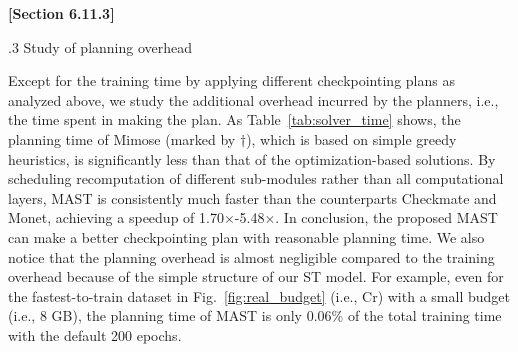 \begin{sloppypar}
\renewcommand{\thetable}{\ref{tab:solver_time}}
\begin{table}[t]
    \centering
    \caption{Planning time (in ms) averaged over budget.}
    \vspace{-1.5ex}
    \vspace{-4ex}
\end{table}

\begin{framed}
    \textbf{[Section 6.11.3]}

.3 Study of planning overhead

Except for the training time by applying different checkpointing plans as analyzed above, we study the additional overhead incurred by the planners, i.e., the time spent in making the plan. As Table~\ref{tab:solver_time} shows, the planning time of Mimose (marked by $\dag$), which is based on simple greedy heuristics, is significantly less than that of the optimization-based solutions. By scheduling recomputation of different sub-modules rather than all computational layers, MAST is consistently much faster than the counterparts Checkmate and Monet, achieving a speedup of 1.70$\times$-5.48$\times$. In conclusion, the proposed MAST can make a better checkpointing plan with reasonable planning time. We also notice that the planning overhead is almost negligible compared to the training overhead because of the simple structure of our ST model. For example, even for the fastest-to-train dataset in Fig.~\ref{fig:real_budget} (i.e., Cr) with a small budget (i.e., 8 GB), the planning time of MAST is only 0.06\% of the total training time with the default 200 epochs. 


\end{framed}
\end{sloppypar}

